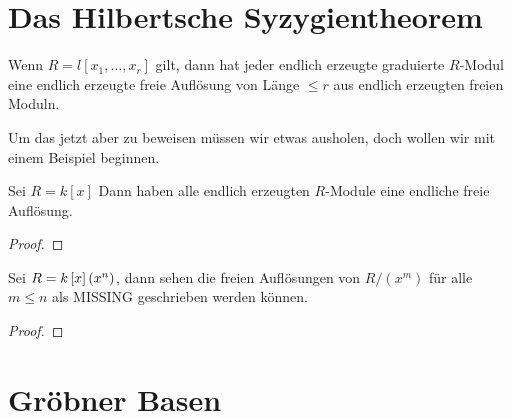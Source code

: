 \documentclass{article}
\begin{document}
\section{Das Hilbertsche Syzygientheorem}
	\begin{thm}
		Wenn 
		\( R = l \left[ x_1,\dots,x_r \right] \)
		gilt,
		dann hat jeder endlich erzeugte graduierte 
		\(R \)-Modul 
		eine endlich erzeugte freie Aufl\"osung von L\"ange 
		\( \le r \) 
		aus endlich erzeugten freien Moduln.
	\end{thm}
	Um das jetzt aber zu beweisen m\"ussen wir etwas ausholen, 
	doch wollen wir mit einem Beispiel beginnen.
	\begin{bsp}[\nocite{Eis1}{Exercise 1.22}]
		Sei 
		\( R = k\left[ x \right] \)
		Dann haben alle endlich erzeugten 
		\(R\)-Module 
		eine endliche freie Aufl\"osung.
		\begin{proof}
		
		\end{proof}
	\end{bsp}	
	\begin{thm}
		
	\end{thm}
	\begin{bsp}
		Sei 
		\( R= k\left[ x \right] \/ \left( x^{n} \right) \),
		dann sehen die freien Aufl\"osungen von 
		\( R\big/ \left( x^{m} \right) \) 
		f\"ur alle 
		\( m \le n \)
		als 
		{\color{red}MISSING}
		geschrieben werden k\"onnen.
		\begin{proof}

		\end{proof}
	\end{bsp}

\section{Gr\"obner Basen}

	

\end{document}
